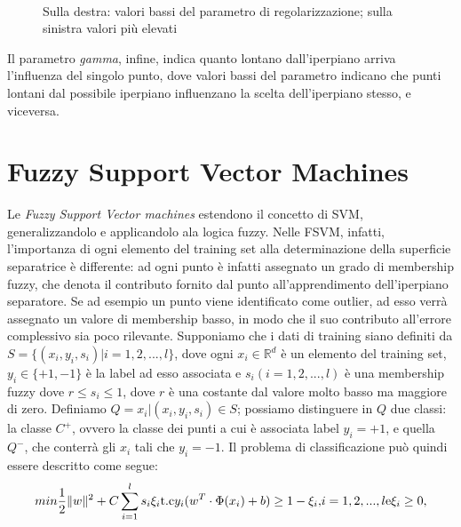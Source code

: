 \documentclass[oneside, openany]{book}
\DeclarePairedDelimiter{\norma}{\lVert}{\rVert}
\begin{document}
	\begin{figure}[h]
		\centering
		 \quad
		 \\
		\caption{Sulla destra: valori bassi del parametro di regolarizzazione; sulla sinistra valori più elevati}
		\label{fig:svm}
	\end{figure}
	Il parametro \textit{gamma}, infine, indica quanto lontano dall'iperpiano arriva l'influenza del singolo punto, dove valori bassi del parametro indicano che punti lontani dal possibile iperpiano influenzano la scelta dell'iperpiano stesso, e viceversa.	
	
	\section{Fuzzy Support Vector Machines}
	Le \textit{Fuzzy Support Vector machines} estendono il concetto di SVM, generalizzandolo e applicandolo ala logica fuzzy. Nelle FSVM, infatti, l'importanza di ogni elemento del training set alla determinazione della superficie separatrice è differente: ad ogni punto è infatti assegnato un grado di membership fuzzy, che denota il contributo fornito dal punto all'apprendimento dell'iperpiano separatore. Se ad esempio un punto viene identificato come outlier, ad esso verrà assegnato un valore di membership basso, in modo che il suo contributo all'errore complessivo sia poco rilevante. Supponiamo che i dati di training siano definiti da $S = \{(x_i, y_i, s_i)| i=1,2,...,l\}$, dove ogni $x_i \in \mathbb{R}^d$ è un elemento del training set, $y_i \in \{+1, -1\}$ è la label ad esso associata e $s_i(i=1,2,...,l)$ è una membership fuzzy dove $r \leq s_i \leq 1$, dove $r$ è una costante dal valore molto basso ma maggiore di zero. Definiamo $Q={x_i|(x_i, y_i, s_i)\in S}$; possiamo distinguere in $Q$ due classi: la classe $C^+$, ovvero la classe dei punti a cui è associata label $y_i=+1$, e quella $Q^-$, che conterrà gli $x_i$ tali che $y_i=-1$. Il problema di classificazione può quindi essere descritto come segue:
		\[
		min \frac{1}{2} \norma{w}^2+C\sum_{i=1}^{l}s_i\xi_i \\	
		\text{t.c} y_i(w^T\cdot \Phi(x_i)+b)\geq 1-\xi_i \text{,} i=1, 2, ..., l\\
		\text{e} \xi_i \geq 0
		\text{,}		
		\]
	
\end{document}
